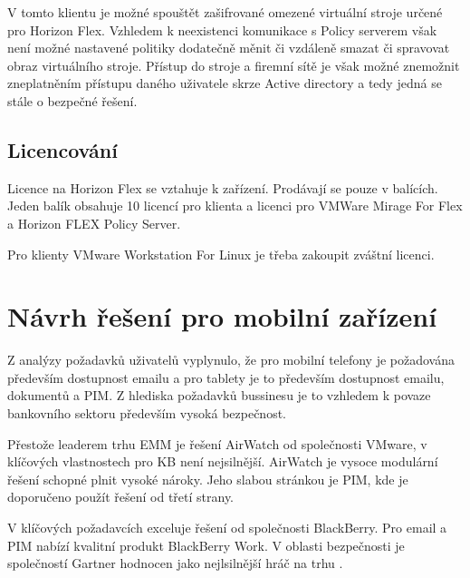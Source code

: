 V tomto klientu je možné spouštět zašifrované omezené virtuální stroje určené pro Horizon Flex. Vzhledem k neexistenci komunikace s Policy serverem však není možné nastavené politiky dodatečně měnit či vzdáleně smazat či spravovat obraz virtuálního stroje. Přístup do stroje a firemní sítě je však možné znemožnit zneplatněním přístupu daného uživatele skrze Active directory a tedy jedná se stále o bezpečné řešení.

\subsection{Licencování}
Licence na Horizon Flex se vztahuje k zařízení. Prodávají se pouze v balících. Jeden balík obsahuje 10 licencí pro klienta a licenci pro VMWare Mirage For Flex a Horizon FLEX Policy Server.

Pro klienty VMware Workstation For Linux je třeba zakoupit zváštní licenci.


\section{Návrh řešení pro mobilní zařízení}

Z analýzy požadavků uživatelů vyplynulo, že pro mobilní telefony je požadována především dostupnost emailu a pro tablety je to především dostupnost emailu, dokumentů a PIM. Z hlediska požadavků bussinesu je to vzhledem k povaze bankovního sektoru především vysoká bezpečnost.

Přestože leaderem trhu EMM je řešení AirWatch od společnosti VMware, v klíčových vlastnostech pro KB není nejsilnější. AirWatch je vysoce modulární řešení schopné plnit vysoké nároky. Jeho slabou stránkou je PIM, kde je doporučeno použít řešení od třetí strany.

V klíčových požadavcích exceluje řešení od společnosti BlackBerry. Pro email a PIM nabízí kvalitní produkt BlackBerry Work. V oblasti bezpečnosti je společností Gartner hodnocen jako nejlsilnější hráč na trhu .


